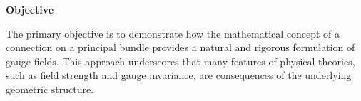 \textbf{Objective}

The primary objective is to demonstrate how the mathematical concept of a connection on a principal bundle provides a natural and rigorous formulation of gauge fields. This approach underscores that many features of physical theories, such as field strength and gauge invariance, are consequences of the underlying geometric structure.
